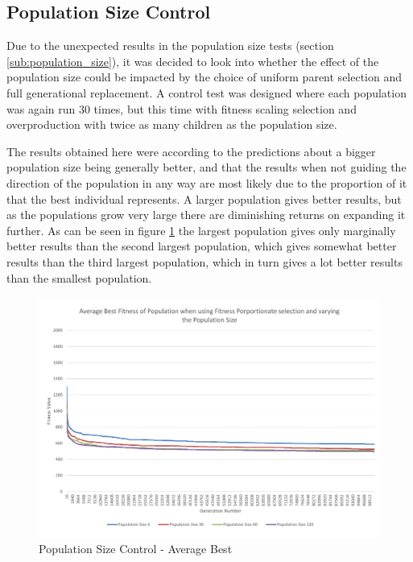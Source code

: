\clearpage

\subsection{Population Size Control} %
\label{sub:population_size_control}

Due to the unexpected results in the population size tests (section \ref{sub:population_size}), it was decided to look into whether the effect of the population size could be impacted by the choice of uniform parent selection and full generational replacement. A control test was designed where each population was again run 30 times, but this time with fitness scaling selection and overproduction with twice as many children as the population size.

The results obtained here were according to the predictions about a bigger population size being generally better, and that the results when not guiding the direction of the population in any way are most likely due to the proportion of it that the best individual represents. A larger population gives better results, but as the populations grow very large there are diminishing returns on expanding it further. As can be seen in figure \ref{fig:cpscab} the largest population gives only marginally better results than the second largest population, which gives somewhat better results than the third largest population, which in turn gives a lot better results than the smallest population.

\begin{landscape}
\begin{figure}[thbp]
	\centerline{\includegraphics[height=0.945\textwidth]{figures/CircleTests/PopulationSizeControl/CirclePopulationSizeControllAverageBest.pdf}}
	\caption{Population Size Control - Average Best}
	\label{fig:cpscab}
\end{figure}
\end{landscape}

